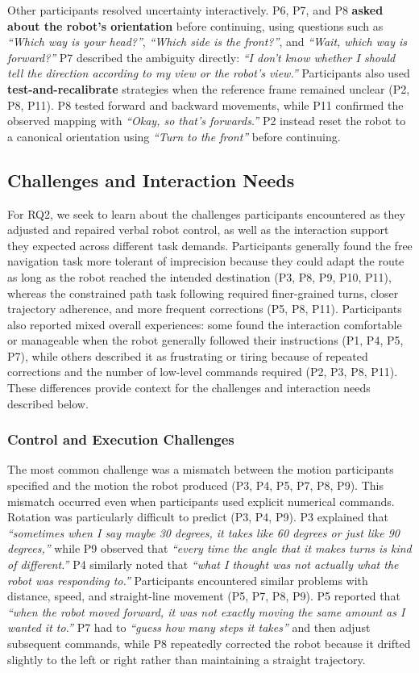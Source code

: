 Other participants resolved uncertainty interactively. P6, P7, and P8 \textbf{asked about the robot's orientation} before continuing, using questions such as \emph{``Which way is your head?''}, \emph{``Which side is the front?''}, and \emph{``Wait, which way is forward?''} P7 described the ambiguity directly: \emph{``I don't know whether I should tell the direction according to my view or the robot's view.''} Participants also used \textbf{test-and-recalibrate} strategies when the reference frame remained unclear (P2, P8, P11). P8 tested forward and backward movements, while P11 confirmed the observed mapping with \emph{``Okay, so that's forwards.''} P2 instead reset the robot to a canonical orientation using \emph{``Turn to the front''} before continuing.

\subsection{Challenges and Interaction Needs}
For RQ2, we seek to learn about the challenges participants encountered as they adjusted and repaired verbal robot control, as well as the interaction support they expected across different task demands. Participants generally found the free navigation task more tolerant of imprecision because they could adapt the route as long as the robot reached the intended destination (P3, P8, P9, P10, P11), whereas the constrained path task following required finer-grained turns, closer trajectory adherence, and more frequent corrections (P5, P8, P11). Participants also reported mixed overall experiences: some found the interaction comfortable or manageable when the robot generally followed their instructions (P1, P4, P5, P7), while others described it as frustrating or tiring because of repeated corrections and the number of low-level commands required (P2, P3, P8, P11). These differences provide context for the challenges and interaction needs described below.

\subsubsection{Control and Execution Challenges}
The most common challenge was a mismatch between the motion participants specified and the motion the robot produced (P3, P4, P5, P7, P8, P9). This mismatch occurred even when participants used explicit numerical commands. Rotation was particularly difficult to predict (P3, P4, P9). P3 explained that \emph{``sometimes when I say maybe 30 degrees, it takes like 60 degrees or just like 90 degrees,''} while P9 observed that \emph{``every time the angle that it makes turns is kind of different.''} P4 similarly noted that \emph{``what I thought was not actually what the robot was responding to.''} Participants encountered similar problems with distance, speed, and straight-line movement (P5, P7, P8, P9). P5 reported that \emph{``when the robot moved forward, it was not exactly moving the same amount as I wanted it to.''} P7 had to \emph{``guess how many steps it takes''} and then adjust subsequent commands, while P8 repeatedly corrected the robot because it drifted slightly to the left or right rather than maintaining a straight trajectory.

